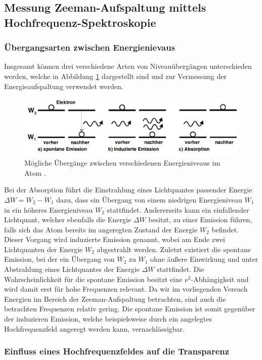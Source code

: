 \subsection{Messung Zeeman-Aufspaltung mittels Hochfrequenz-Spektroskopie}


\subsubsection{Übergangsarten zwischen Energienievaus}
Insgesamt können drei verschiedene Arten von Niveauübergängen unterschieden werden, welche in Abbildung \ref{fig:theorie3} dargestellt sind und zur Vermessung der Energieaufspaltung verwendet werden.

\begin{figure}
  \centering
  \includegraphics[height=3cm]{ressources/theorie3.png}
  \caption{Mögliche Übergänge zwischen verschiedenen Energieniveaus im Atom \cite{skript}.}
  \label{fig:theorie3}
\end{figure}

Bei der Absorption führt die Einstrahlung eines Lichtquantes passender Energie $\Delta W = W_2 - W_1$ dazu, dass ein Übergang von einem niedrigen Energieniveau $W_1$ in ein höheres Energieniveau $W_2$ stattfindet.
Andererseits kann ein einfallender Lichtquant, welcher ebenfalls die Energie $\Delta W$ besitzt, zu einer Emission führen, falls sich das Atom bereits im angeregten Zustand der Energie $W_2$ befindet.
Dieser Vorgang wird induzierte Emission genannt, wobei am Ende zwei Lichtquanten der Energie $W_2$ abgestrahlt werden.
Zuletzt existiert die spontane Emission, bei der ein Übergang von $W_2$ zu $W_1$ ohne äußere Einwirkung und unter Abstrahlung eines Lichtquantes der Energie $\Delta W$ stattfindet.
Die Wahrscheinlichkeit für die spontane Emission besitzt eine $\nu^3$-Abhängigkeit und wird damit erst für hohe Frequenzen relevant.
Da wir im vorliegenden Versuch Energien im Bereich der Zeeman-Aufspaltung betrachten, sind auch die betrachten Frequenzen relativ gering.
Die spontane Emission ist somit gegenüber der induzieren Emission, welche beispielsweise durch ein angelegtes Hochfrequenzfeld angeregt werden kann, vernachlässigbar.

\subsubsection{Einfluss eines Hochfrequenzfeldes auf die Transparenz}

